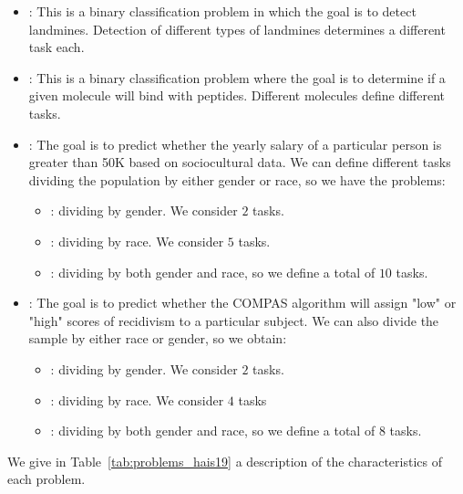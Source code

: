 \begin{itemize}
    \item {}: This is a binary classification problem in which the goal is to detect landmines. Detection of different types of landmines determines a different task each. 
    \item {}: This is a binary classification problem where the goal is to determine if a given molecule will bind with peptides. Different molecules define different tasks.
    \item {}: The goal is to predict whether the yearly salary of a particular person is greater than 50K based on sociocultural data. We can define different tasks dividing the population by either gender or race, so we have the problems:
    \begin{itemize}
        \item {}: dividing by gender. We consider $2$ tasks.
        \item {}: dividing by race. We consider $5$ tasks.
        \item {}: dividing by both gender and race, so we define a total of $10$ tasks.
    \end{itemize}
    \item {}: The goal is to predict whether the COMPAS algorithm will assign "low" or "high" scores of recidivism to a particular subject. We can also divide the sample by either race or gender, so we obtain:
    \begin{itemize}
        \item {}: dividing by gender. We consider $2$ tasks.
        \item {}: dividing by race. We consider $4$ tasks
        \item {}: dividing by both gender and race, so we define a total of $8$ tasks.
    \end{itemize}
\end{itemize}
We give in Table~\ref{tab:problems_hais19} a description of the characteristics of each problem.

